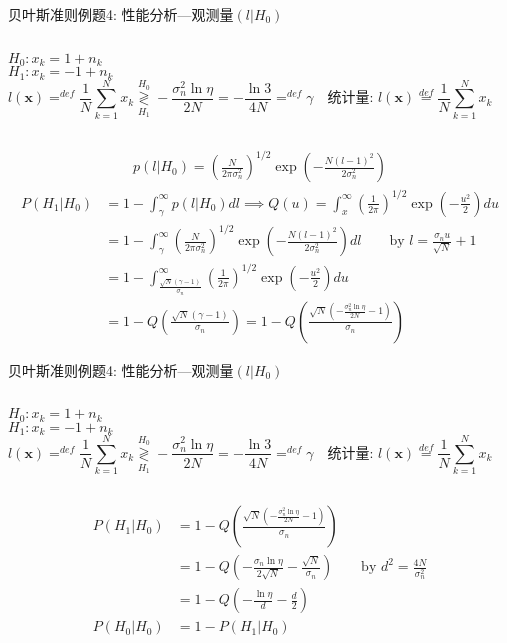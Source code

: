 \begin{frame}[shrink]{贝叶斯准则例题4: 性能分析---观测量$(l|H_0)$}
\begin{columns}
	$H_0:x_k=1+n_k$\\
	$H_1:x_k=-1+n_k$
	\[
	l(\bm{x})\mathop{=}^{def}\frac{1}{N}\sum\limits_{k=1}^{N}x_k\mathop{\gtrless}\limits_{H_1}^{H_0}-\frac{\sigma_n^2\ln\eta}{2N}=-\frac{\ln3}{4N}\mathop{=}^{def}\gamma \quad \textbf{统计量: }l(\bm{x})\mathop{=}\limits^{def}\frac{1}{N}\sum\limits_{k=1}^{N}x_k
	\]
\end{columns}
\begin{align*}
p(l|H_0)=\left(\frac{N}{2\pi\sigma_n^2}\right)^{1/2}\exp\left(-\frac{N(l-1)^2}{2\sigma_n^2}\right)
\end{align*}
\begin{align*}
P(H_1|H_0)&=1-\int_{\gamma}^{\infty}p(l|H_0)dl\implies Q(u)=\int_{x}^{\infty}\left(\frac{1}{2\pi}\right)^{1/2}\exp\left(-\frac{u^2}{2}\right)du\\
&=1-\int_{\gamma}^{\infty}\left(\frac{N}{2\pi\sigma_n^2}\right)^{1/2}\exp\left(-\frac{N(l-1)^2}{2\sigma_n^2}\right)dl\qquad \text{by } l=\frac{\sigma_nu}{\sqrt{N}}+1\\
&=1-\int_{\frac{\sqrt{N}(\gamma-1)}{\sigma_n}}^{\infty}\left(\frac{1}{2\pi}\right)^{1/2}\exp\left(-\frac{u^2}{2}\right)du\\
&=1-Q\left(\frac{\sqrt{N}(\gamma-1)}{\sigma_n}\right)=1-Q\left(\frac{\sqrt{N}\left(-\frac{\sigma_n^2\ln\eta}{2N}-1\right)}{\sigma_n}\right)
\end{align*}
\end{frame}

\begin{frame}[shrink]{贝叶斯准则例题4: 性能分析---观测量$(l|H_0)$}
\begin{columns}
	$H_0:x_k=1+n_k$\\
	$H_1:x_k=-1+n_k$
	\[
	l(\bm{x})\mathop{=}^{def}\frac{1}{N}\sum\limits_{k=1}^{N}x_k\mathop{\gtrless}\limits_{H_1}^{H_0}-\frac{\sigma_n^2\ln\eta}{2N}=-\frac{\ln3}{4N}\mathop{=}^{def}\gamma \quad \textbf{统计量: }l(\bm{x})\mathop{=}\limits^{def}\frac{1}{N}\sum\limits_{k=1}^{N}x_k
	\]
\end{columns}
\begin{align*}
P(H_1|H_0)&=1-Q\left(\frac{\sqrt{N}\left(-\frac{\sigma_n^2\ln\eta}{2N}-1\right)}{\sigma_n}\right)\\
&=1-Q\left(-\frac{\sigma_n\ln\eta}{2\sqrt{N}}-\frac{\sqrt{N}}{\sigma_n}\right)&& \text{by }d^2=\frac{4N}{\sigma_n^2}\\
&=1-Q\left(-\frac{\ln\eta}{d}-\frac{d}{2}\right)\\
P(H_0|H_0)&=1-P(H_1|H_0)
\end{align*}
\end{frame}

